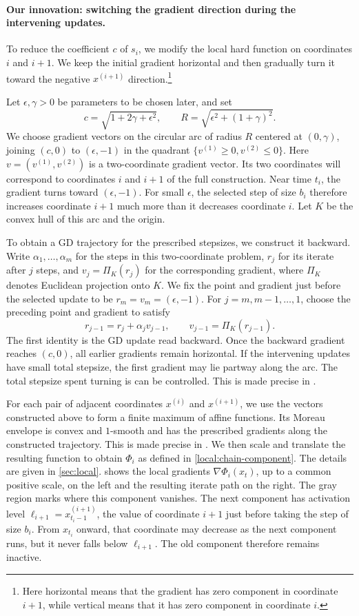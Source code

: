 \documentclass[11pt,letterpaper]{article}
\theoremstyle{definition}
\begin{document}
\paragraph{Our innovation: switching the gradient direction during the intervening updates.}
To reduce the coefficient $c$ of $s_i$, we modify the local hard function on coordinates $i$ and $i+1$.
We keep the initial gradient horizontal and then gradually turn it toward the negative $x^{(i+1)}$ direction.\footnote{Here horizontal means that the gradient has zero component in coordinate $i+1$, while vertical means that it has zero component in coordinate $i$.}

Let $\epsilon,\gamma>0$ be parameters to be chosen later, and set
\[
  c=\sqrt{1+2\gamma+\epsilon^2},\qquad
  R=\sqrt{\epsilon^2+(1+\gamma)^2}.
\]
We choose gradient vectors on the circular arc of radius $R$ centered at $(0,\gamma)$, joining $(c,0)$ to $(\epsilon,-1)$ in the quadrant $\{v^{(1)}\ge0,v^{(2)}\le0\}$.
Here $v=(v^{(1)},v^{(2)})$ is a two-coordinate gradient vector.
Its two coordinates will correspond to coordinates $i$ and $i+1$ of the full construction.
Near time $t_i$, the gradient turns toward $(\epsilon,-1)$.
For small $\epsilon$, the selected step of size $b_i$ therefore increases coordinate $i+1$ much more than it decreases coordinate $i$.
Let $K$ be the convex hull of this arc and the origin.

To obtain a GD trajectory for the prescribed stepsizes, we construct it backward.
Write $\alpha_1,\ldots,\alpha_m$ for the steps in this two-coordinate problem, $r_j$ for its iterate after $j$ steps, and $v_j=\Pi_K(r_j)$ for the corresponding gradient, where $\Pi_K$ denotes Euclidean projection onto $K$.
We fix the point and gradient just before the selected update to be $r_m=v_m=(\epsilon,-1)$.
For $j=m,m-1,\ldots,1$, choose the preceding point and gradient to satisfy
\[
  r_{j-1}=r_j+\alpha_jv_{j-1},
  \qquad v_{j-1}=\Pi_K(r_{j-1}).
\]
The first identity is the GD update read backward.
Once the backward gradient reaches $(c,0)$, all earlier gradients remain horizontal.
If the intervening updates have small total stepsize, the first gradient may lie partway along the arc. The total stepsize spent turning is can be controlled. This is made precise in .

For each pair of adjacent coordinates $x^{(i)}$ and $x^{(i+1)}$, we use the vectors constructed above to form a finite maximum of affine functions.
Its Moreau envelope is convex and $1$-smooth and has the prescribed gradients along the constructed trajectory. This is made precise in .
We then scale and translate the resulting function to obtain $\Phi_i$ as defined in \eqref{local:chain-component}.
The details are given in \cref{sec:local}.
 shows the local gradients $\nabla\Phi_i(x_t)$, up to a common positive scale, on the left and the resulting iterate path on the right.
The gray region marks where this component vanishes.
The next component has activation level $\ell_{i+1}=x_{t_i-1}^{(i+1)}$, the value of coordinate $i+1$ just before taking the step of size $b_i$.
From $x_{t_i}$ onward, that coordinate may decrease as the next component runs, but it never falls below $\ell_{i+1}$. The old component therefore remains inactive.
\end{document}
